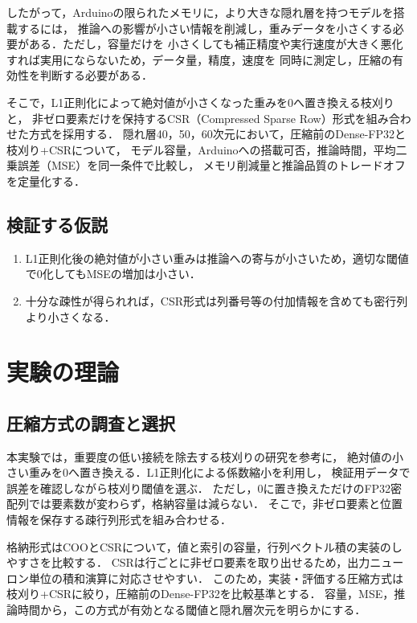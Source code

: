 \documentclass[a4paper,11pt]{article}
\begin{document}
したがって，Arduinoの限られたメモリに，より大きな隠れ層を持つモデルを搭載するには，
推論への影響が小さい情報を削減し，重みデータを小さくする必要がある．ただし，容量だけを
小さくしても補正精度や実行速度が大きく悪化すれば実用にならないため，データ量，精度，速度を
同時に測定し，圧縮の有効性を判断する必要がある．

そこで，L1正則化によって絶対値が小さくなった重みを0へ置き換える枝刈りと，
非ゼロ要素だけを保持するCSR（Compressed Sparse Row）形式を組み合わせた方式を採用する．
隠れ層40，50，60次元において，圧縮前のDense-FP32と枝刈り+CSRについて，
モデル容量，Arduinoへの搭載可否，推論時間，平均二乗誤差（MSE）を同一条件で比較し，
メモリ削減量と推論品質のトレードオフを定量化する．

\subsection{検証する仮説}

\begin{enumerate}
  \item L1正則化後の絶対値が小さい重みは推論への寄与が小さいため，適切な閾値で0化してもMSEの増加は小さい．
  \item 十分な疎性が得られれば，CSR形式は列番号等の付加情報を含めても密行列より小さくなる．
\end{enumerate}

\section{実験の理論}

\subsection{圧縮方式の調査と選択}

本実験では，重要度の低い接続を除去する枝刈りの研究\cite{han2015}を参考に，
絶対値の小さい重みを0へ置き換える．L1正則化による係数縮小\cite{tibshirani1996}を利用し，
検証用データで誤差を確認しながら枝刈り閾値を選ぶ．
ただし，0に置き換えただけのFP32密配列では要素数が変わらず，格納容量は減らない．
そこで，非ゼロ要素と位置情報を保存する疎行列形式を組み合わせる．

格納形式はCOOとCSRについて，値と索引の容量，行列ベクトル積の実装のしやすさを比較する．
CSRは行ごとに非ゼロ要素を取り出せるため，出力ニューロン単位の積和演算に対応させやすい．
このため，実装・評価する圧縮方式は枝刈り+CSRに絞り，圧縮前のDense-FP32を比較基準とする．
容量，MSE，推論時間から，この方式が有効となる閾値と隠れ層次元を明らかにする．
\end{document}
